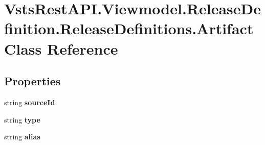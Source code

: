 \hypertarget{class_vsts_rest_a_p_i_1_1_viewmodel_1_1_release_definition_1_1_release_definitions_1_1_artifact}{}\section{Vsts\+Rest\+A\+P\+I.\+Viewmodel.\+Release\+Definition.\+Release\+Definitions.\+Artifact Class Reference}
\label{class_vsts_rest_a_p_i_1_1_viewmodel_1_1_release_definition_1_1_release_definitions_1_1_artifact}
\subsection*{Properties}
\begin{DoxyCompactItemize}
\item 
\mbox{\label{class_vsts_rest_a_p_i_1_1_viewmodel_1_1_release_definition_1_1_release_definitions_1_1_artifact_aaa31f78ea05ecb462350b9ef4f8fdc42}} 
string {\bfseries source\+Id}
\item 
\mbox{\label{class_vsts_rest_a_p_i_1_1_viewmodel_1_1_release_definition_1_1_release_definitions_1_1_artifact_ac62beb38a0e8dc63c95560a973c15b10}} 
string {\bfseries type}
\item 
\mbox{\label{class_vsts_rest_a_p_i_1_1_viewmodel_1_1_release_definition_1_1_release_definitions_1_1_artifact_ac4d248a0f9d6154546cbb1a5aa80ee2f}} 
string {\bfseries alias}
\item 
\mbox{\label{class_vsts_rest_a_p_i_1_1_viewmodel_1_1_release_definition_1_1_release_definitions_1_1_artifact_ae376bb1b225afff0dbaf2009167953bb}} 

\end{DoxyCompactItemize}
